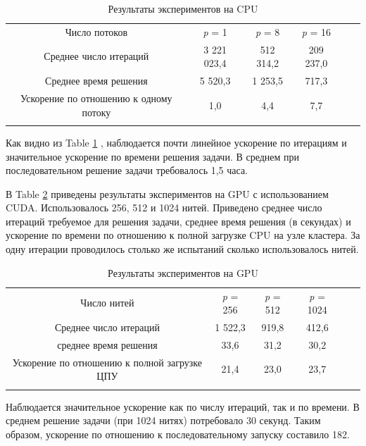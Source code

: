 \documentclass{llncs}
\begin{document}
\begin{table}
	\caption{Результаты экспериментов на CPU}
	\label{tab:2}
	\center
	\begin{tabular}{cccccc}
		\hline\noalign{\smallskip}
        
		Число потоков & \textit{p} = 1 & \textit{p} = 8 & \textit{p} = 16 \\
	\noalign{\smallskip} \hline \noalign{\smallskip}

		Среднее число итераций  & 3 221 023,4 & 512 314,2 & 209 237,0 \\
		Среднее время решения & 5 520,3 & 1 253,5 & 717,3 \\
		Ускорение по отношению к одному потоку & 1,0 & 4,4 & 7,7 \\
		\noalign{\smallskip}\hline
	\end{tabular}
\end{table}


Как видно из Table \ref{tab:2} , наблюдается почти линейное ускорение по итерациям и значительное ускорение по времени решения задачи. В среднем при последовательном решение задачи требовалось 1,5 часа.

В Table \ref{tab:3} приведены результаты экспериментов на GPU с использованием CUDA. Использовалось 256, 512 и 1024 нитей. Приведено среднее число итераций требуемое для решения задачи, среднее время решения (в секундах) и ускорение по времени по отношению к полной загрузке CPU на узле кластера. За одну итерации проводилось столько же испытаний сколько использовалось нитей.

\begin{table}
	\caption{Результаты экспериментов на GPU}
	\label{tab:3}
	\center
	\begin{tabular}{cccccc}
		\hline\noalign{\smallskip}
        
		Число нитей & \textit{p} = 256 & \textit{p} = 512 & \textit{p} = 1024 \\
	\noalign{\smallskip} \hline \noalign{\smallskip}

		Среднее число итераций  & 1 522,3 & 919,8 & 412,6 \\
		среднее время решения & 33,6 & 31,2 & 30,2 \\
		Ускорение по отношению к полной загрузке ЦПУ & 21,4 & 23,0 & 23,7 \\

		\noalign{\smallskip}\hline
	\end{tabular}
\end{table}

Наблюдается значительное ускорение как по числу итераций, так и по времени. В среднем решение задачи (при 1024 нитях) потребовало 30 секунд. Таким образом, ускорение по отношению к последовательному запуску составило 182.
\end{document}
